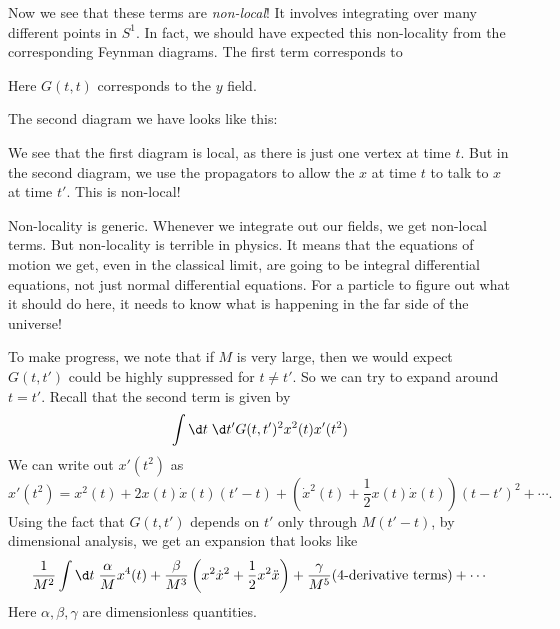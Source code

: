 \documentclass[a4paper]{article}
\begin{document}
Now we see that these terms are \emph{non-local}! It involves integrating over many different points in $S^1$. In fact, we should have expected this non-locality from the corresponding Feynman diagrams. The first term corresponds to
\begin{center}
\end{center}
Here $G(t, t)$ corresponds to the $y$ field.

The second diagram we have looks like this:
\begin{center}
\end{center}
We see that the first diagram is local, as there is just one vertex at time $t$. But in the second diagram, we use the propagators to allow the $x$ at time $t$ to talk to $x$ at time $t'$. This is non-local!

Non-locality is generic. Whenever we integrate out our fields, we get non-local terms. But non-locality is terrible in physics. It means that the equations of motion we get, even in the classical limit, are going to be integral differential equations, not just normal differential equations. For a particle to figure out what it should do here, it needs to know what is happening in the far side of the universe!

To make progress, we note that if $M$ is very large, then we would expect $G(t, t')$ could be highly suppressed for $t \not= t'$. So we can try to expand around $t = t'$. Recall that the second term is given by
\[
  \int \d t\; \d t' G(t, t')^2 x^2(t) x'(t^2)
\]
We can write out $x'(t^2)$ as
\[
  x'(t^2) = x^2 (t) + 2x(t) \dot{x}(t) (t' - t) + \left(\dot{x}^2(t) + \frac{1}{2} x(t) \dot{x}(t)\right) (t - t')^2 + \cdots.
\]
Using the fact that $G(t, t')$ depends on $t'$ only through $M(t' - t)$, by dimensional analysis, we get an expansion that looks like
\[
  \frac{1}{M^2} \int \d t\; \frac{\alpha}{M} x^4(t) + \frac{\beta}{M^3} \left(x^2 \dot{x}^2 + \frac{1}{2} x^2 \ddot{x}\right) + \frac{\gamma}{M^5} (\text{4-derivative terms}) + \cdots
\]
Here $\alpha, \beta, \gamma$ are dimensionless quantities.
\end{document}
